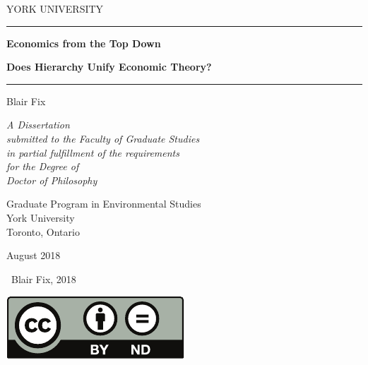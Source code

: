 
\graphicspath{{frontmatter/}}

\begin{center}
	\thispagestyle{empty}
	
	{	
		\Large
		\color{darkred} 	YORK UNIVERSITY}
	
		\bigskip
		\bigskip
		\bigskip
	

	\noindent\rule{\textwidth}{0.4pt}
	
	\Huge
	\textbf{Economics from the Top Down} 
	
	
	\LARGE
	\textbf{Does Hierarchy Unify Economic Theory?}
	
				\centering
				\noindent\rule{\textwidth}{0.4pt}
	
	\bigskip
	\bigskip
	\bigskip
	
	Blair Fix
	
	
	\bigskip
	\bigskip
	\bigskip
	\bigskip
	\bigskip

	
	\normalsize
	
\textit{	A Dissertation \\ submitted to  the Faculty of Graduate Studies \\
	in partial fulfillment of the requirements \\ for the Degree of  \\
	Doctor of Philosophy}
	
	\bigskip
	\bigskip
	\bigskip
	\bigskip
	\bigskip
	\bigskip

	{\color{darkred} 
	Graduate Program in Environmental Studies \\
	York University \\
	Toronto, Ontario
	}
	
	\bigskip
	August 2018
	\bigskip
	
	\textcopyright ~Blair Fix, 2018
	
	
	
\end{center}

\bigskip
\centerline{\includegraphics[scale=0.6]{by-nd}}
\bigskip
\bigskip


